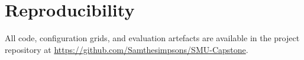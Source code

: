 \section{Reproducibility}
\label{sec:reproducibility}

All code, configuration grids, and evaluation artefacts are available in the project repository at \url{https://github.com/Samthesimpsons/SMU-Capstone}.
